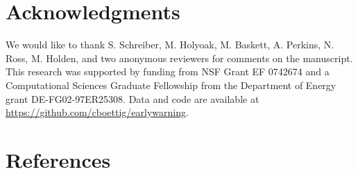 \documentclass[authoryear,review,11pt]{elsarticle}
\begin{document}
\section{Acknowledgments}
We would like to thank S. Schreiber, M. Holyoak, M. Baskett, A. Perkins, N. 
Ross, M. Holden, and two anonymous reviewers for comments on the manuscript. 
This research was supported by funding from NSF Grant EF 0742674 
and a Computational Sciences Graduate Fellowship from the Department of Energy grant DE-FG02-97ER25308. 
Data and code are available at \href{https://github.com/cboettig/earlywarning}{ https://github.com/cboettig/earlywarning}.




\section{References}%

%
 
\end{document}
